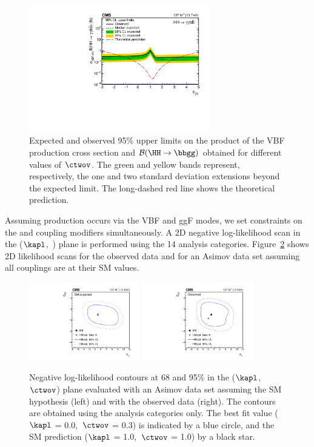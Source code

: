 \documentclass[11pt,a4paper,cmspaper,final,collab]{cms-tdr}
\begin{document}
\begin{figure}[!ht]
  \centering
\includegraphics[width=0.7\textwidth]{Figure_014.pdf}\hfil 

  \caption{Expected and observed 95\% \CL upper limits on the product of the VBF \HH production cross section and $\mathcal{B}(\HH\to\bbgg)$ obtained for different values of $\ctwov$. The green and yellow bands represent, respectively, the one and two standard deviation extensions beyond the expected limit.
The long-dashed red line shows the theoretical prediction.
}
\label{fig:ctwovscan}
\end{figure}

Assuming \HH production occurs via the VBF and ggF modes, we set constraints on the \kapl and \ctwov coupling modifiers simultaneously. A 2D negative log-likelihood scan in the ($\kapl$,~\ctwov) plane is performed using the 14 \HH analysis categories. 
Figure~\ref{fig:klctwovlikelihood} shows 2D likelihood scans for the observed data and for an Asimov data set assuming all couplings are at their SM values.

\begin{figure}[!htb]
  \centering
\includegraphics[width=0.43\textwidth]{Figure_015-a.pdf}
\includegraphics[width=0.43\textwidth]{Figure_015-b.pdf}
  \caption{Negative log-likelihood contours at 68 and 95\% \CL in the ($\kapl$,~$\ctwov$) plane evaluated with an Asimov data set assuming the SM hypothesis (left) and with the observed data (right). The contours are obtained using the \HH analysis categories only. The best fit value ($\kapl$ = 0.0,~$\ctwov$ = 0.3) is indicated by a blue circle, and the SM prediction ($\kapl$ = 1.0,~$\ctwov$ = 1.0) by a black star.}
  \label{fig:klctwovlikelihood}
\end{figure}
\end{document}
